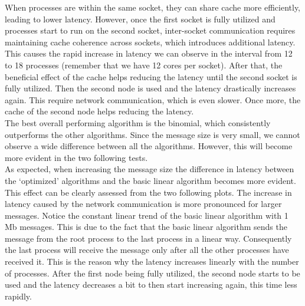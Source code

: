     When processes are within the same socket, they can share cache more
    efficiently, leading to lower latency. However, once the first socket
    is fully utilized and processes start to run on the second socket,
    inter-socket communication requires maintaining cache coherence
    across sockets, which introduces additional latency. This causes
    the rapid increase in latency we can observe in the interval from
    12 to 18 processes (remember that we have 12 cores per socket).
    After that, the beneficial effect of the cache helps reducing the
    latency until the second socket is fully utilized. Then the second
    node is used and the latency drastically increases again. This
    require network communication, which is even slower.
    Once more, the cache of the second node helps reducing the latency. \\
    The best overall performing algorithm is the binomial, which 
    consistently outperforms the other algorithms. Since the message
    size is very small, we cannot observe a wide difference between
    all the algorithms. However, this will become more evident in the
    two following tests. \\
    As expected, when increasing the message size the difference in latency
    between the \enquote*{optimized} algorithms and the basic linear
    algorithm becomes more evident. This effect can be clearly assessed
    from the two following plots. The increase in latency caused by the
    network communication is more pronounced for larger messages. Notice
    the constant linear trend of the basic linear algorithm with 1 Mb
    messages. This is due to the fact that the basic linear algorithm
    sends the message from the root process to the last process in a
    linear way. Consequently the last process will receive the message
    only after all the other processes have received it. This is the
    reason why the latency increases linearly with the number of processes.
    After the first node being fully utilized, the second node starts to
    be used and the latency decreases a bit to then start increasing again,
    this time less rapidly.
    
